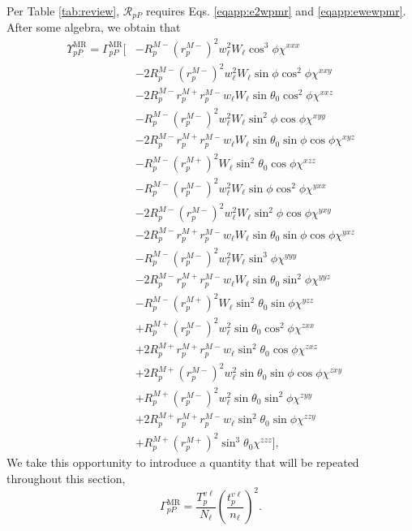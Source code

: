 Per Table \ref{tab:review}, $\mathcal{R}_{pP}$ requires Eqs. \eqref{eqapp:e2wpmr}
and \eqref{eqapp:ewewpmr}. After some algebra, we obtain that
\begin{equation}\label{eqapp:rppfullmr}
\begin{split}
\Upsilon^{\mathrm{MR}}_{pP} =
\Gamma^{\mathrm{MR}}_{pP}
\bigg[
&-R^{M-}_{p}\left(r^{M-}_{p}\right)^{2}w^{2}_{\ell}W_{\ell}\cos^{3}\phi
\chi^{xxx}\\
&-2R^{M-}_{p}\left(r^{M-}_{p}\right)^{2}w^{2}_{\ell}W_{\ell}\sin\phi\cos^{2}\phi
\chi^{xxy}\\
&-2R^{M-}_{p}r^{M+}_{p}r^{M-}_{p}w_{\ell}W_{\ell}\sin\theta_{0}\cos^{2}\phi
\chi^{xxz}\\
&-R^{M-}_{p}\left(r^{M-}_{p}\right)^{2}w^{2}_{\ell}W_{\ell}\sin^{2}\phi\cos\phi
\chi^{xyy}\\
&-2R^{M-}_{p}r^{M+}_{p}r^{M-}_{p}w_{\ell}W_{\ell}\sin\theta_{0}\sin\phi\cos\phi
\chi^{xyz}\\
&-R^{M-}_{p}\left(r^{M+}_{p}\right)^{2}W_{\ell}\sin^{2}\theta_{0}\cos\phi
\chi^{xzz}\\
&-R^{M-}_{p}\left(r^{M-}_{p}\right)^{2}w^{2}_{\ell}W_{\ell}\sin\phi\cos^{2}\phi
\chi^{yxx}\\
&-2R^{M-}_{p}\left(r^{M-}_{p}\right)^{2}w^{2}_{\ell}W_{\ell}\sin^{2}\phi\cos\phi
\chi^{yxy}\\
&-2R^{M-}_{p}r^{M+}_{p}r^{M-}_{p}w_{\ell}W_{\ell}\sin\theta_{0}\sin\phi\cos\phi
\chi^{yxz}\\
&-R^{M-}_{p}\left(r^{M-}_{p}\right)^{2}w^{2}_{\ell}W_{\ell}\sin^{3}\phi
\chi^{yyy}\\
&-2R^{M-}_{p}r^{M+}_{p}r^{M-}_{p}w_{\ell}W_{\ell}\sin\theta_{0}\sin^{2}\phi
\chi^{yyz}\\
&-R^{M-}_{p}\left(r^{M+}_{p}\right)^{2}W_{\ell}\sin^{2}\theta_{0}\sin\phi
\chi^{yzz}\\
&+R^{M+}_{p}\left(r^{M-}_{p}\right)^{2}w^{2}_{\ell}\sin\theta_{0}\cos^{2}\phi
\chi^{zxx}\\
&+2R^{M+}_{p}r^{M+}_{p}r^{M-}_{p}w_{\ell}\sin^{2}\theta_{0}\cos\phi
\chi^{zxz}\\
&+2R^{M+}_{p}\left(r^{M-}_{p}\right)^{2}w^{2}_{\ell}\sin\theta_{0}\sin\phi
\cos\phi\chi^{zxy}\\
&+R^{M+}_{p}\left(r^{M-}_{p}\right)^{2}w^{2}_{\ell}\sin\theta_{0}\sin^{2}\phi
\chi^{zyy}\\
&+2R^{M+}_{p}r^{M+}_{p}r^{M-}_{p}w_{\ell}\sin^{2}\theta_{0}\sin\phi
\chi^{zzy}\\
&+R^{M+}_{p}\left(r^{M+}_{p}\right)^{2}\sin^{3}\theta_{0}
\chi^{zzz}
\bigg],
\end{split}
\end{equation}
We take this opportunity to introduce a quantity that will be repeated
throughout this section,
\begin{equation}\label{eqapp:gammappmr}
\Gamma^{\mathrm{MR}}_{pP} =
\frac{T^{v\ell}_{p}}{N_{\ell}}
\left(\frac{t^{v\ell}_{p}}{n_{\ell}}\right)^{2}.
\end{equation}

